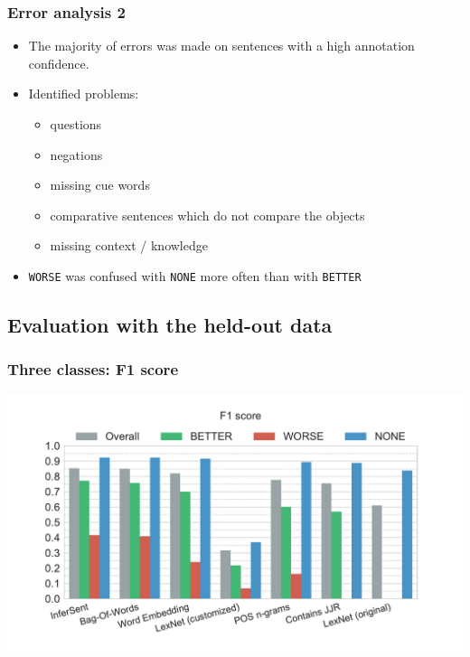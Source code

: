 \documentclass[11pt,aspectratio=169,usenames,dvipsnames]{beamer}
\begin{document}
    
    \begin{frame}[t]
        \frametitle{Error analysis 2}
        
        \begin{itemize}
         \item The majority of errors was made on sentences with a high annotation confidence.
            \item Identified problems:
            \begin{itemize}
            \item questions
            \item negations
            \item missing cue words
            \item comparative sentences which do not compare the objects
            \item missing context / knowledge
            \end{itemize}
            \item \texttt{WORSE} was confused with \texttt{NONE} more often than with \texttt{BETTER}
        \end{itemize}

        \end{frame}

    \subsection{Evaluation with the held-out data}
    \frame{\subsectionpage}

    \begin{frame}[t]
        \frametitle{Three classes: F1 score}
        \centerline{\includegraphics[scale=0.45,trim={0 0 0 0.5cm},clip]{images/experiments/hp-f1-False}}
    \end{frame}
\end{document}
